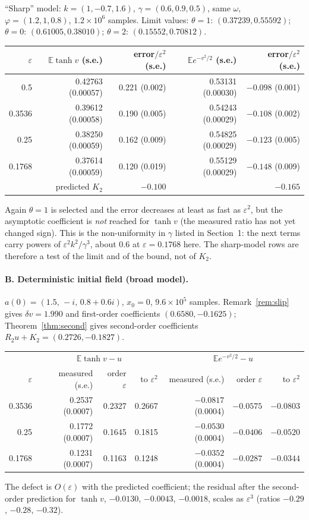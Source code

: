 \documentclass[11pt]{article}
\newcommand{\E}{\mathbb{E}}
\newcommand{\eps}{\varepsilon}
\theoremstyle{remark}
\begin{document}
``Sharp'' model: $k=(1,-0.7,1.6)$, $\gamma=(0.6,0.9,0.5)$, same $\omega$,
$\varphi=(1.2,1,0.8)$, $1.2\times10^6$ samples. Limit values:
$\theta=1$: $(0.37239,0.55592)$; $\theta=0$: $(0.61005,0.38010)$;
$\theta=2$: $(0.15552,0.70812)$.
\begin{center}
\begin{tabular}{rrrrr}
  $\eps$ & $\E\tanh v$ (s.e.) & error$/\eps^2$ (s.e.) &
  $\E e^{-v^2/2}$ (s.e.) & error$/\eps^2$ (s.e.) \\ \hline
  0.5 & 0.42763 (0.00057) & 0.221 (0.002) & 0.53131 (0.00030) & $-0.098$ (0.001) \\
  0.3536 & 0.39612 (0.00058) & 0.190 (0.005) & 0.54243 (0.00029) & $-0.108$ (0.002) \\
  0.25 & 0.38250 (0.00059) & 0.162 (0.009) & 0.54825 (0.00029) & $-0.123$ (0.005) \\
  0.1768 & 0.37614 (0.00059) & 0.120 (0.019) & 0.55129 (0.00029) & $-0.148$ (0.009) \\ \hline
  \multicolumn{2}{r}{predicted $K_2$} & $-0.100$ & & $-0.165$ \\
\end{tabular}
\end{center}
Again $\theta=1$ is selected and the error decreases at least as fast as
$\eps^2$, but the asymptotic coefficient is \emph{not} reached for
$\tanh v$ (the measured ratio has not yet changed sign). This is the
non-uniformity in $\gamma$ listed in Section~1: the next terms carry
powers of $\eps^2k^2/\gamma^3$, about $0.6$ at $\eps=0.1768$ here. The
sharp-model rows are therefore a test of the limit and of the bound, not of
$K_2$.

\paragraph{B. Deterministic initial field (broad model).} $a(0)=(1.5,\,-i,\,
0.8+0.6i)$, $x_0=0$, $9.6\times10^5$ samples. Remark~\ref{rem:slip} gives
$\delta v=1.990$ and first-order coefficients $(0.6580,-0.1625)$;
Theorem~\ref{thm:second} gives second-order coefficients
$R_2u+K_2=(0.2726,-0.1827)$.
\begin{center}
\begin{tabular}{rrrrrrr}
  & \multicolumn{3}{c}{$\E\tanh v-u$} & \multicolumn{3}{c}{$\E e^{-v^2/2}-u$} \\
  $\eps$ & measured (s.e.) & order $\eps$ & to $\eps^2$ &
  measured (s.e.) & order $\eps$ & to $\eps^2$ \\ \hline
  0.3536 & 0.2537 (0.0007) & 0.2327 & 0.2667 & $-0.0817$ (0.0004) & $-0.0575$ & $-0.0803$ \\
  0.25 & 0.1772 (0.0007) & 0.1645 & 0.1815 & $-0.0530$ (0.0004) & $-0.0406$ & $-0.0520$ \\
  0.1768 & 0.1231 (0.0007) & 0.1163 & 0.1248 & $-0.0352$ (0.0004) & $-0.0287$ & $-0.0344$ \\
\end{tabular}
\end{center}
The defect is $O(\eps)$ with the predicted coefficient; the residual after
the second-order prediction for $\tanh v$, $-0.0130$, $-0.0043$, $-0.0018$,
scales as $\eps^3$ (ratios $-0.29$, $-0.28$, $-0.32$).
\end{document}
